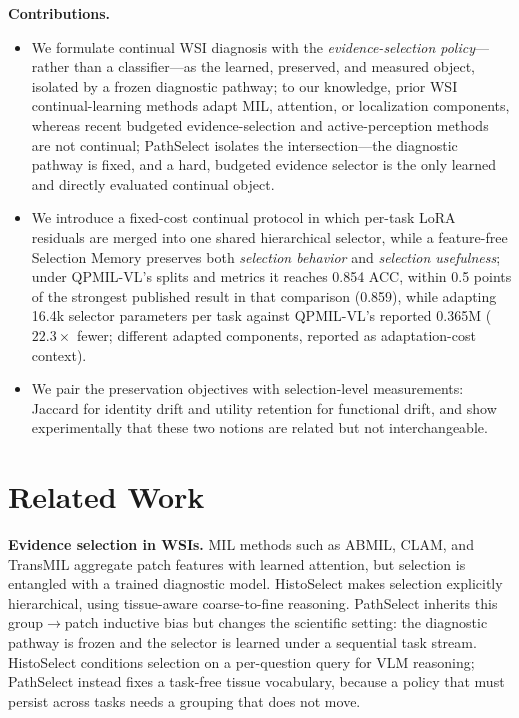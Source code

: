 \documentclass{article}
\begin{document}
\textbf{Contributions.}
\begin{itemize}
    \item We formulate continual WSI diagnosis with the \emph{evidence-selection policy}---rather than a classifier---as the learned, preserved, and measured object, isolated by a frozen diagnostic pathway; to our knowledge, prior WSI continual-learning methods adapt MIL, attention, or localization components, whereas recent budgeted evidence-selection and active-perception methods are not continual; PathSelect isolates the intersection---the diagnostic pathway is fixed, and a hard, budgeted evidence selector is the only learned and directly evaluated continual object.
    \item We introduce a fixed-cost continual protocol in which per-task LoRA residuals are merged into one shared hierarchical selector, while a feature-free Selection Memory preserves both \emph{selection behavior} and \emph{selection usefulness}; under QPMIL-VL's splits and metrics it reaches 0.854 ACC, within 0.5 points of the strongest published result in that comparison (0.859), while adapting 16.4k selector parameters per task against QPMIL-VL's reported 0.365M ($22.3\times$ fewer; different adapted components, reported as adaptation-cost context).
    \item We pair the preservation objectives with selection-level measurements: Jaccard for identity drift and utility retention for functional drift, and show experimentally that these two notions are related but not interchangeable.
\end{itemize}

\section{Related Work}
\label{sec:related}

\textbf{Evidence selection in WSIs.}
MIL methods such as ABMIL, CLAM, and TransMIL \cite{ilse2018abmil,lu2021clam,shao2021transmil} aggregate patch features with learned attention, but selection is entangled with a trained diagnostic model.
HistoSelect \cite{huang2026histoselect} makes selection explicitly hierarchical, using tissue-aware coarse-to-fine reasoning.
PathSelect inherits this group$\rightarrow$patch inductive bias but changes the scientific setting: the diagnostic pathway is frozen and the selector is learned under a sequential task stream. HistoSelect conditions selection on a per-question query for VLM reasoning; PathSelect instead fixes a task-free tissue vocabulary, because a policy that must persist across tasks needs a grouping that does not move.
\end{document}

